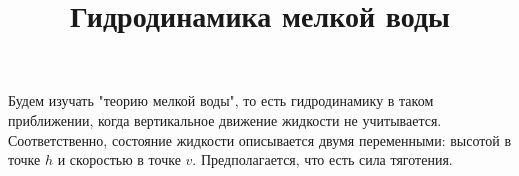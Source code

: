 \documentclass{article}
\title{Гидродинамика мелкой воды}
\begin{document}
\maketitle
Будем изучать "теорию мелкой воды", то есть гидродинамику в таком приближении,
когда вертикальное движение жидкости не учитывается. Соответственно, состояние жидкости
описывается двумя переменными: высотой в точке $h$ и скоростью в точке $v$. Предполагается, 
что есть сила тяготения.
\end{document}
